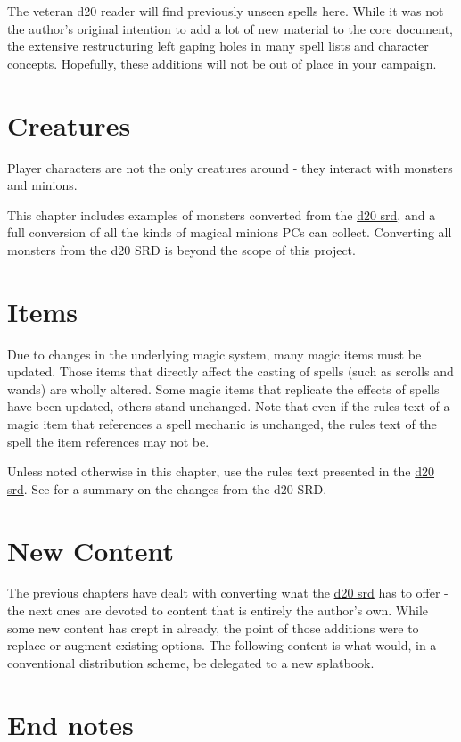 \documentclass[a4paper,10pt]{article}
\begin{document}
\begin{multicols}{2}
The veteran d20 reader will find previously unseen spells here. While it was not the author's original intention to add a lot of new material to the core document, the extensive restructuring left gaping holes in many spell lists and character concepts. Hopefully, these additions will not be out of place in your campaign.
\newpage

\part{Creatures}
Player characters are not the only creatures around - they interact with monsters and minions.

This chapter includes examples of monsters converted from the \href{http://www.wizards.com/default.asp?x=d20/article/srd35}{d20 srd}, and a full conversion of all the kinds of magical minions PCs can collect. Converting all monsters from the d20 SRD is beyond the scope of this project.
\newpage

\part{Items}
Due to changes in the underlying magic system, many magic items must be updated.
Those items that directly affect the casting of spells (such as scrolls and wands) are wholly altered.
Some magic items that replicate the effects of spells have been updated, others stand unchanged.
Note that even if the rules text of a magic item that references a spell mechanic is unchanged, the rules text of the spell the item references may not be.

Unless noted otherwise in this chapter, use the rules text presented in the \href{http://www.wizards.com/default.asp?x=d20/article/srd35}{d20 srd}. See  for a summary on the changes from the d20 SRD.
\newpage

\part{New Content}
The previous chapters have dealt with converting what the \href{http://www.wizards.com/default.asp?x=d20/article/srd35}{d20 srd} has to offer - the next ones are devoted to content that is entirely the author's own. While some new content has crept in already, the point of those additions were to replace or augment existing options. The following content is what would, in a conventional distribution scheme, be delegated to a new splatbook. 
\newpage
\part{End notes}

\end{multicols}
\end{document}
